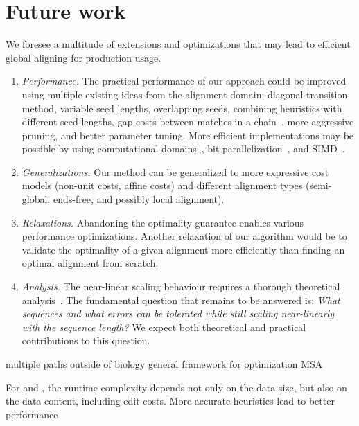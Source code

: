 \section{Future work}

We foresee a multitude of extensions and optimizations that may lead to
efficient global aligning for production usage.

\begin{enumerate}
    \item \emph{Performance.} The practical performance of our \A approach could
        be improved using multiple existing ideas from the alignment domain:
        diagonal transition method, variable seed lengths, overlapping seeds,
        combining heuristics with different seed lengths, gap costs between
        matches in a chain~\citep{ukkonen1985algorithms,wilbur1984context}, more
        aggressive pruning, and better parameter tuning. More efficient
        implementations may be possible by using computational
        domains~\citep{spouge1989speeding}, bit-parallelization~\citep{myers1999fast},
        and SIMD~\citep{marco2021fast}.
    \item \emph{Generalizations.} Our method can be generalized to more
        expressive cost models (non-unit costs, affine costs) and different alignment
        types (semi-global, ends-free, and possibly local alignment).
    \item \emph{Relaxations.} Abandoning the optimality guarantee
        enables various performance optimizations. Another relaxation
        of our algorithm would be to validate the optimality of a given alignment more
        efficiently than finding an optimal alignment from scratch.
    \item \emph{Analysis.} The near-linear scaling behaviour requires a thorough
        theoretical analysis~\citep{medvedev2022limitations}. The fundamental
        question that remains to be answered is: \emph{What sequences and what
        errors can be tolerated while still scaling near-linearly with the
        sequence length?} We expect both theoretical and practical contributions
        to this question.
\end{enumerate}

multiple paths
outside of biology
general framework for optimization
MSA

For \dijkstra and \astarix, the runtime complexity depends not only on the data
size, but also on the data content, including edit costs. More accurate
heuristics lead to better \A performance~\cite{pearl_discovery_1983}

